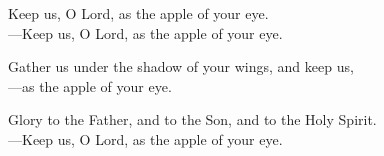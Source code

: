 \responsory

\noindent Keep us, O Lord, as the apple of your eye.\\
{\color{red}---\thinspace}Keep us, O Lord, as the apple of your eye.

\medskip\noindent Gather us under the shadow of your wings, and keep us,\\
{\color{red}---\thinspace}as the apple of your eye.

\medskip\noindent Glory to the Father, and to the Son, and to the Holy Spirit.\\
{\color{red}---\thinspace}Keep us, O Lord, as the apple of your eye.